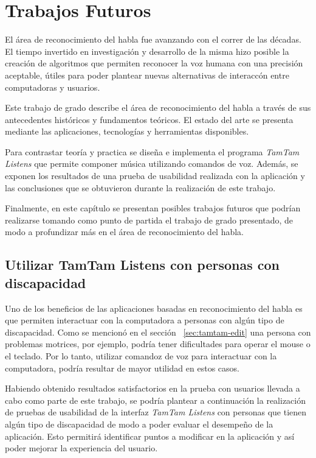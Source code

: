 \chapter{Trabajos Futuros}
\label{sec:trabajos-futuros}

El \'area de reconocimiento del habla fue avanzando con el correr de las d\'ecadas. El tiempo invertido
en investigaci\'on y desarrollo de la misma hizo posible la creaci\'on de algoritmos que permiten
reconocer la voz humana con una precisi\'on aceptable, \'utiles para poder plantear nuevas alternativas
de interacc\'on entre computadoras y usuarios. 

Este trabajo de grado describe el \'area de reconocimiento del habla a través de sus antecedentes
históricos y fundamentos teóricos. El estado del arte se presenta mediante las aplicaciones, tecnolog\'ias 
y herramientas disponibles.

Para contrastar teor\'ia y practica se diseña e implementa el programa \emph{TamTam Listens} que permite 
componer m\'usica utilizando comandos de voz. Además, se exponen los resultados de una prueba de usabilidad
realizada con la aplicación y las conclusiones que se obtuvieron durante la realización de este trabajo. 

Finalmente, en este capítulo se presentan posibles trabajos futuros que podr\'ian realizarse tomando 
como punto de partida el trabajo de grado presentado, de modo a profundizar m\'as en el \'area de reconocimiento del habla.

\section{Utilizar TamTam Listens con personas con discapacidad}

Uno de los beneficios de las aplicaciones basadas en reconocimiento del habla es que permiten  interactuar con la computadora a personas con alg\'un tipo de discapacidad. Como se mencion\'o en el secci\'on~
\ref{sec:tamtam-edit} una persona con problemas motrices, por ejemplo, podr\'ia tener dificultades para 
operar el mouse o el teclado. 
Por lo tanto, utilizar comandoz de voz para interactuar con la computadora, podr\'ia resultar de mayor 
utilidad en estos casos.

Habiendo obtenido resultados satisfactorios en la prueba con usuarios llevada a cabo como parte de este 
trabajo, se podr\'ia plantear a continuaci\'on la realizaci\'on de pruebas de usabilidad de la interfaz 
\emph{TamTam Listens} con personas que tienen alg\'un tipo de discapacidad de modo a poder evaluar el 
desempe\~no de la aplicaci\'on. 
Esto permitir\'a identificar puntos a modificar en la aplicaci\'on y as\'i poder mejorar la experiencia del
usuario.

